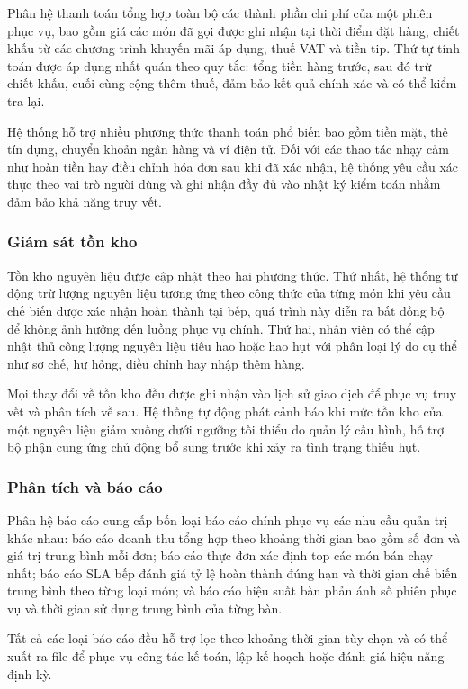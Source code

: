 Phân hệ thanh toán tổng hợp toàn bộ các thành phần chi phí của một phiên phục vụ, bao gồm giá các món đã gọi được ghi nhận tại thời điểm đặt hàng, chiết khấu từ các chương trình khuyến mãi áp dụng, thuế VAT và tiền tip. Thứ tự tính toán được áp dụng nhất quán theo quy tắc: tổng tiền hàng trước, sau đó trừ chiết khấu, cuối cùng cộng thêm thuế, đảm bảo kết quả chính xác và có thể kiểm tra lại.

Hệ thống hỗ trợ nhiều phương thức thanh toán phổ biến bao gồm tiền mặt, thẻ tín dụng, chuyển khoản ngân hàng và ví điện tử. Đối với các thao tác nhạy cảm như hoàn tiền hay điều chỉnh hóa đơn sau khi đã xác nhận, hệ thống yêu cầu xác thực theo vai trò người dùng và ghi nhận đầy đủ vào nhật ký kiểm toán nhằm đảm bảo khả năng truy vết.

\subsubsection{Giám sát tồn kho}

Tồn kho nguyên liệu được cập nhật theo hai phương thức. Thứ nhất, hệ thống tự động trừ lượng nguyên liệu tương ứng theo công thức của từng món khi yêu cầu chế biến được xác nhận hoàn thành tại bếp, quá trình này diễn ra bất đồng bộ để không ảnh hưởng đến luồng phục vụ chính. Thứ hai, nhân viên có thể cập nhật thủ công lượng nguyên liệu tiêu hao hoặc hao hụt với phân loại lý do cụ thể như sơ chế, hư hỏng, điều chỉnh hay nhập thêm hàng.

Mọi thay đổi về tồn kho đều được ghi nhận vào lịch sử giao dịch để phục vụ truy vết và phân tích về sau. Hệ thống tự động phát cảnh báo khi mức tồn kho của một nguyên liệu giảm xuống dưới ngưỡng tối thiểu do quản lý cấu hình, hỗ trợ bộ phận cung ứng chủ động bổ sung trước khi xảy ra tình trạng thiếu hụt.

\subsubsection{Phân tích và báo cáo}

Phân hệ báo cáo cung cấp bốn loại báo cáo chính phục vụ các nhu cầu quản trị khác nhau: báo cáo doanh thu tổng hợp theo khoảng thời gian bao gồm số đơn và giá trị trung bình mỗi đơn; báo cáo thực đơn xác định top các món bán chạy nhất; báo cáo SLA bếp đánh giá tỷ lệ hoàn thành đúng hạn và thời gian chế biến trung bình theo từng loại món; và báo cáo hiệu suất bàn phản ánh số phiên phục vụ và thời gian sử dụng trung bình của từng bàn.

Tất cả các loại báo cáo đều hỗ trợ lọc theo khoảng thời gian tùy chọn và có thể xuất ra file để phục vụ công tác kế toán, lập kế hoạch hoặc đánh giá hiệu năng định kỳ.

